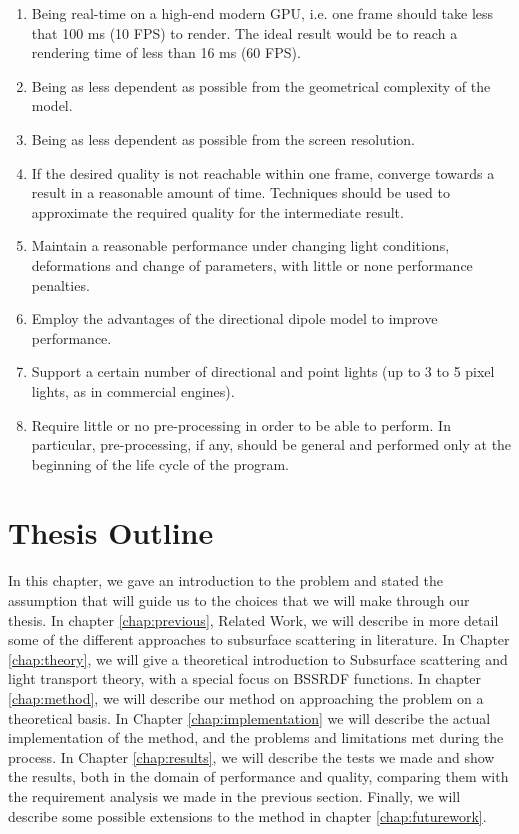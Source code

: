 \begin{enumerate}
	\item Being real-time on a high-end modern GPU, i.e. one frame should take less that 100 ms (10 FPS) to render. The ideal result would be to reach a rendering time of less than 16 ms (60 FPS).
	\item Being as less dependent as possible from the geometrical complexity of the model.
	\item Being as less dependent as possible from the screen resolution.
	\item If the desired quality is not reachable within one frame, converge towards a result in a reasonable amount of time. Techniques should be used to approximate the required quality for the intermediate result. 
	\item Maintain a reasonable performance under changing light conditions, deformations and change of parameters, with little or none performance penalties.
	\item Employ the advantages of the directional dipole model to improve performance.
	\item Support a certain number of directional and point lights (up to 3 to 5 pixel lights, as in commercial engines\citep{unitymanual}).
	\item Require little or no pre-processing in order to be able to perform. In particular, pre-processing, if any, should be general and performed only at the beginning of the life cycle of the program. 
\end{enumerate}

\section{Thesis Outline}

In this chapter, we gave an introduction to the problem and stated the assumption that will guide us to the choices that we will make through our thesis. In chapter \ref{chap:previous}, Related Work, we will describe in more detail some of the different approaches to subsurface scattering in literature. In Chapter \ref{chap:theory}, we will give a theoretical introduction to Subsurface scattering and light transport theory, with a special focus on BSSRDF functions. In chapter \ref{chap:method}, we will describe our method on approaching the problem on a theoretical basis. In Chapter \ref{chap:implementation} we will describe the actual implementation of the method, and the problems and limitations met during the process. In Chapter \ref{chap:results}, we will describe the tests we made and show the results, both in the domain of performance and quality, comparing them with the requirement analysis we made in the previous section. Finally, we will describe some possible extensions to the method in chapter \ref{chap:futurework}.  

